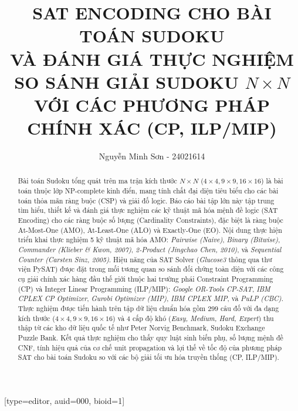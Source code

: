 \documentclass[a4paper,fleqn,nologo]{cas-sc}
\begin{document}
\let\WriteBookmarks\relax
\renewcommand{\topfraction}{0.9}
\renewcommand{\bottomfraction}{0.85}
\renewcommand{\textfraction}{0.1}
\renewcommand{\floatpagefraction}{0.75}
\setlength{\textfloatsep}{12pt plus 2pt minus 2pt}
\setlength{\floatsep}{10pt plus 2pt minus 2pt}
\setlength{\intextsep}{10pt plus 2pt minus 2pt}


\title [mode = title]{SAT ENCODING CHO BÀI TOÁN SUDOKU\\
VÀ ĐÁNH GIÁ THỰC NGHIỆM SO SÁNH GIẢI SUDOKU $N \times N$ VỚI CÁC PHƯƠNG PHÁP CHÍNH XÁC (CP, ILP/MIP)}

\author[1]{Nguyễn Minh Sơn - 24021614}[type=editor, auid=000, bioid=1]
\cormark[1]

\address[1]{Các vấn đề hiện đại về KHMT, Khoa công nghệ thông tin, Trường đại học Công nghệ}


\begin{abstract}
Bài toán Sudoku tổng quát trên ma trận kích thước $N \times N$ ($4\times4, 9\times9, 16\times16$) là bài toán thuộc lớp NP-complete kinh điển, mang tính chất đại diện tiêu biểu cho các bài toán thỏa mãn ràng buộc (CSP) và giải đố logic. Báo cáo bài tập lớn này tập trung tìm hiểu, thiết kế và đánh giá thực nghiệm các kỹ thuật mã hóa mệnh đề logic (SAT Encoding) cho các ràng buộc số lượng (Cardinality Constraints), đặc biệt là ràng buộc At-Most-One (AMO), At-Least-One (ALO) và Exactly-One (EO). Nội dung thực hiện triển khai thực nghiệm 5 kỹ thuật mã hóa AMO: \textit{Pairwise (Naive)}, \textit{Binary (Bitwise)}, \textit{Commander (Klieber \& Kwon, 2007)}, \textit{2-Product (Jingchao Chen, 2010)}, và \textit{Sequential Counter (Carsten Sinz, 2005)}. Hiệu năng của SAT Solver (\textit{Glucose3} thông qua thư viện PySAT) được đặt trong mối tương quan so sánh đối chứng toàn diện với các công cụ giải chính xác hàng đầu thế giới thuộc hai trường phái Constraint Programming (CP) và Integer Linear Programming (ILP/MIP): \textit{Google OR-Tools CP-SAT}, \textit{IBM CPLEX CP Optimizer}, \textit{Gurobi Optimizer (MIP)}, \textit{IBM CPLEX MIP}, và \textit{PuLP (CBC)}. Thực nghiệm được tiến hành trên tập dữ liệu chuẩn hóa gồm 299 câu đố với đa dạng kích thước ($4\times4, 9\times9, 16\times16$) và 4 cấp độ khó (\textit{Easy, Medium, Hard, Expert}) thu thập từ các kho dữ liệu quốc tế như Peter Norvig Benchmark, Sudoku Exchange Puzzle Bank. Kết quả thực nghiệm cho thấy quy luật sinh biến phụ, số lượng mệnh đề CNF, tính hiệu quả của cơ chế unit propagation và lợi thế về tốc độ của phương pháp SAT cho bài toán Sudoku so với các bộ giải tối ưu hóa truyền thống (CP, ILP/MIP).
\end{abstract}
\end{document}
